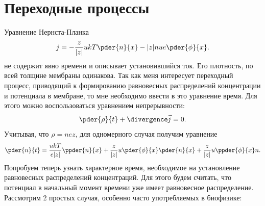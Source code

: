 \documentclass{hedwork}
\begin{document}
\section{Переходные процессы}
    Уравнение Нернста-Планка
    \begin{equation}
        j = -\frac{z}{|z|}ukT\pder{n}{x} - |z|nue\pder{\phi}{x}.
        \label{eq:nernst-plank}
    \end{equation}
    не содержит явно времени и описывает установившийся ток. Его плотность,
    по всей толщине мембраны одинакова. Так как меня интересует переходный
    процесс, приводящий к формированию равновесных распределений концентрации
    и потенциала в мембране, то мне необходимо ввести в это уравнение время.
    Для этого можно воспользоваться уравнением непрерывности:
    \begin{equation}
        \pder{\rho}{t} + \divergence\vec{j} = 0.
    \end{equation}
    Учитывая, что \( \rho = nez \), для одномерного случая получим уравнение
    \begin{equation}
        \pder{n}{t} = \frac{ukT}{e|z|}\ppder{n}{x} +
            \frac{z}{|z|}u\pder{\phi}{x}\pder{n}{x} +
            \frac{z}{|z|}u\ppder{\phi}{x}n.
        \label{eq:nernst-plank_with_time}
    \end{equation}
    Попробуем теперь узнать характерное время, необходимое на установление
    равновесных распределений концентраций. Для этого будем считать, что
    потенциал в начальный момент времени уже имеет равновесное
    распределение. Рассмотрим 2 простых случая, особенно часто употребляемых в
    биофизике:
\end{document}

